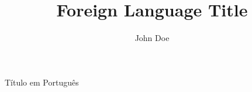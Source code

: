 
\title{%
	Foreign Language Title %
}{%
	Título em Português
}

\author{John Doe}








\def\textdedications{
	I'm Dedications\\
	this is dedications\\
	dedications
}


\def\textacknowledgements{
	I'm Acknowledments\\
	hello me.
}

\def\finalversiontext{
	Este exemplar corresponde à versão final da monografia/dissertação/tese defendida pelo(a) aluno(a) John Doe, e orientada pelo(a) Prof(a). Dr(a). Supervisor Full Name e co-orientada pelo(a) Prof(a). Dr(a). Cosupervisor Full Name.
}